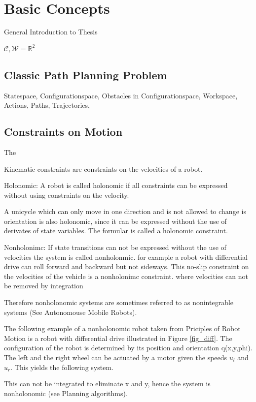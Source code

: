 \chapter{Basic Concepts}\label{ch:introductionplanning}
General Introduction to Thesis

$\mathcal{C,W} = \mathbb{R}^2$

\section{Classic Path Planning Problem}\label{sec:basic}
Statespace,
Configurationspace,
Obstacles in Configurationspace,
Workspace,
Actions,
Paths,
Trajectories,

\section{Constraints on Motion}\label{sec:model}
The 

Kinematic constraints are constraints on the velocities of a robot.


Holonomic:
A robot is called holonomic if all constraints can be expressed without using constraints on the velocity. 

A unicycle which can only move in one direction and is not allowed to change is orientation is also holonomic, since  it can be expressed without the use of derivates of state variables.
The formular is called a holonomic constraint.

Nonholonimc:
If state transitions can not be expressed without the use of velocities the system is called nonholonmic.
for example a robot with differential drive can roll forward and backward but not sideways. 
This no-slip constraint on the velocities of the vehicle is a nonholonimc constraint.
where velocities can not be removed by integration 

Therefore nonholonomic systems are sometimes referred to as nonintegrable systems (See Autonomouse Mobile Robots).


The following example of a nonholonomic robot taken from Priciples of Robot Motion is a robot with differential drive illustrated in Figure \ref{fig_diff}.
The configuration of the robot is determined by its position and orientation q(x,y,phi).
The left and the right wheel can be actuated by a motor given the speeds $u_l$ and $u_r$.
This yields the following system.

This can not be integrated to eliminate x and y, hence the system is nonholonomic (see Planning algorithms).
  
